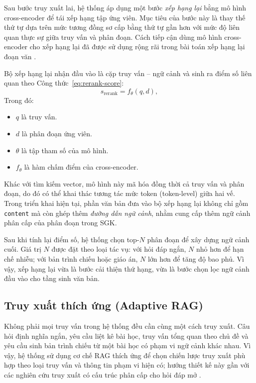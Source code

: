 \documentclass[../DoAn.tex]{subfiles}
\begin{document}
Sau bước truy xuất lai, hệ thống áp dụng một bước \textit{xếp hạng lại} bằng mô hình cross-encoder để tái xếp hạng tập ứng viên. Mục tiêu của bước này là thay thế thứ tự dựa trên mức tương đồng sơ cấp bằng thứ tự gần hơn với mức độ liên quan thực sự giữa truy vấn và phân đoạn. Cách tiếp cận dùng mô hình cross-encoder cho xếp hạng lại đã được sử dụng rộng rãi trong bài toán xếp hạng lại đoạn văn \cite{nogueira2019passage}.

Bộ xếp hạng lại nhận đầu vào là cặp truy vấn -- ngữ cảnh và sinh ra điểm số liên quan theo Công thức~\ref{eq:rerank-score}:
\begin{equation}
s_{\mathrm{rerank}} = f_{\theta}(q, d),
\label{eq:rerank-score}
\end{equation}
Trong đó:\\
\begin{itemize}
\item $q$ là truy vấn.
\item $d$ là phân đoạn ứng viên.
\item $\theta$ là tập tham số của mô hình.
\item $f_{\theta}$ là hàm chấm điểm của cross-encoder.
\end{itemize}
Khác với tìm kiếm vector, mô hình này mã hóa đồng thời cả truy vấn và phân đoạn, do đó có thể khai thác tương tác mức token (token-level) giữa hai vế. Trong triển khai hiện tại, phần văn bản đưa vào bộ xếp hạng lại không chỉ gồm \texttt{content} mà còn ghép thêm \textit{đường dẫn ngữ cảnh}, nhằm cung cấp thêm ngữ cảnh phân cấp của phân đoạn trong SGK.

Sau khi tính lại điểm số, hệ thống chọn top-$N$ phân đoạn để xây dựng ngữ cảnh cuối. Giá trị $N$ được đặt theo loại tác vụ: với hỏi đáp ngắn, $N$ nhỏ hơn để hạn chế nhiễu; với bản trình chiếu hoặc giáo án, $N$ lớn hơn để tăng độ bao phủ. Vì vậy, xếp hạng lại vừa là bước cải thiện thứ hạng, vừa là bước chọn lọc ngữ cảnh đầu vào cho tầng sinh văn bản.

\subsection{Truy xuất thích ứng (Adaptive RAG)}
\label{subsec:adaptive-rag}

Không phải mọi truy vấn trong hệ thống đều cần cùng một cách truy xuất. Câu hỏi định nghĩa ngắn, yêu cầu liệt kê bài học, truy vấn tổng quan theo chủ đề và yêu cầu sinh bản trình chiếu từ một bài học có phạm vi ngữ cảnh khác nhau. Vì vậy, hệ thống sử dụng cơ chế RAG thích ứng để chọn chiến lược truy xuất phù hợp theo loại truy vấn và thông tin phạm vi hiện có; hướng thiết kế này gần với các nghiên cứu truy xuất có cấu trúc phân cấp cho hỏi đáp mở \cite{liu2021densehierarchical}.
\end{document}
